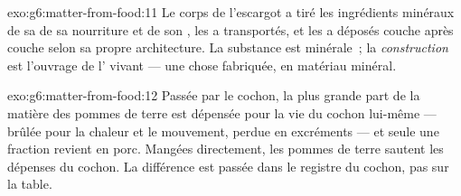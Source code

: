 \begin{solution}{exo:g6:matter-from-food:11}
Le corps de l'escargot a tiré les ingrédients minéraux de sa
 de sa nourriture et de son , les a
transportés, et les a déposés couche après couche selon sa propre
architecture. La substance est minérale~; la \emph{construction} est
l'ouvrage de l' vivant --- une chose fabriquée, en matériau
minéral.
\end{solution}

\begin{solution}{exo:g6:matter-from-food:12}
Passée par le cochon, la plus grande part de la matière des pommes
de terre est dépensée pour la vie du cochon lui-même --- brûlée pour
la chaleur et le mouvement, perdue en excréments --- et seule une
fraction revient en porc. Mangées directement, les pommes de terre
sautent les dépenses du cochon. La différence est passée dans le
registre du cochon, pas sur la table.
\end{solution}

